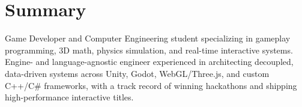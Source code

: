 \section{Summary}
Game Developer and Computer Engineering student specializing in gameplay programming, 3D math, physics simulation, and real-time interactive systems. Engine- and language-agnostic engineer experienced in architecting decoupled, data-driven systems across Unity, Godot, WebGL/Three.js, and custom C++/C\# frameworks, with a track record of winning hackathons and shipping high-performance interactive titles.
